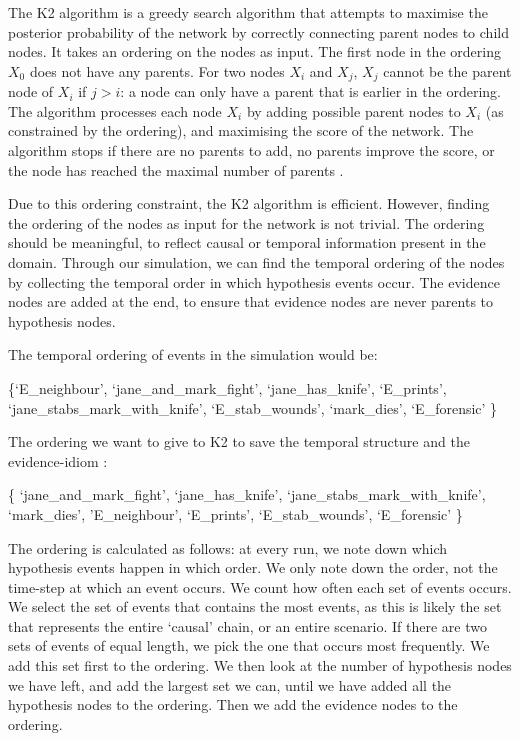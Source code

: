 The K2 algorithm is a greedy search algorithm that attempts to maximise the posterior probability of the network by correctly connecting parent nodes to child nodes. It takes an ordering on the nodes as input. The first node in the ordering $X_0$ does not have any parents. For two nodes $X_i$ and $X_j$, $X_j$ cannot be the parent node of $X_i$ if $j > i$: a node can only have a parent that is earlier in the ordering. The algorithm processes each node $X_i$ by adding possible parent nodes to $X_i$ (as constrained by the ordering), and maximising the score of the network. The algorithm stops if there are no parents to add, no parents improve the score, or the node has reached the maximal number of parents \citep{Chen2008}.

Due to this ordering constraint, the K2 algorithm is efficient. However, finding the ordering of the nodes as input for the network is not trivial. The ordering should be meaningful, to reflect causal or temporal information present in the domain. Through our simulation, we can find the temporal ordering of the nodes by collecting the temporal order in which hypothesis events occur. The evidence nodes are added at the end, to ensure that evidence nodes are never parents to hypothesis nodes. 

\begin{example}
The temporal ordering of events in the simulation would be:

\{`E\_neighbour', `jane\_and\_mark\_fight', 
`jane\_has\_knife', `E\_prints',
 `jane\_stabs\_mark\_with\_knife', `E\_stab\_wounds',
 `mark\_dies', `E\_forensic' 
 \}
 
 The ordering we want to give to K2 to save the temporal structure and the evidence-idiom \citet{Fenton2012}:
 
 \{ `jane\_and\_mark\_fight', 
`jane\_has\_knife', 
 `jane\_stabs\_mark\_with\_knife', 
 `mark\_dies',
 'E\_neighbour',
  `E\_prints',
 `E\_stab\_wounds',
  `E\_forensic' 
 \}

\end{example}


The ordering is calculated as follows: at every run, we note down which hypothesis events happen in which order. We only note down the order, not the time-step at which an event occurs. We count how often each set of events occurs. We select the set of events that contains the most events, as this is likely the set that represents the entire `causal' chain, or an entire scenario. If there are two sets of events of equal length, we pick the one that occurs most frequently. We add this set first to the ordering. We then look at the number of hypothesis nodes we have left, and add the largest set we can, until we have added all the hypothesis nodes to the ordering. Then we add the evidence nodes to the ordering.

